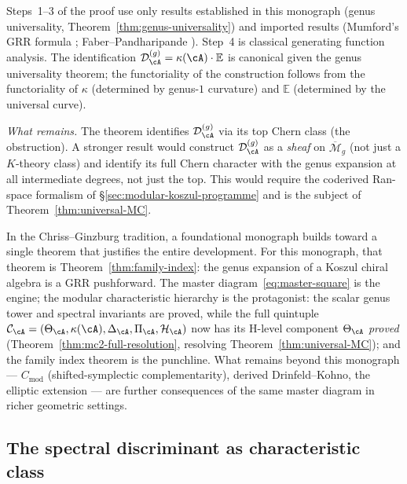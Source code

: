 \begin{remark}[Scope]\label{rem:family-index-scope}
Steps~1--3 of the proof use only results established
in this monograph (genus universality,
Theorem~\ref{thm:genus-universality}) and imported results
(Mumford's GRR formula \cite{Mumford83}; Faber--Pandharipande
\cite{FP00}).  Step~4 is classical generating function analysis.
The identification $\mathcal{D}_{\cA}^{(g)} =
\kappa(\cA) \cdot \mathbb{E}$ is canonical given the genus
universality theorem; the functoriality of the construction
follows from the functoriality of $\kappa$ (determined by
genus-$1$ curvature) and $\mathbb{E}$ (determined by the
universal curve).

\emph{What remains.}
The theorem identifies $\mathcal{D}_{\cA}^{(g)}$ via its top Chern
class (the obstruction).  A stronger result would construct
$\mathcal{D}_{\cA}^{(g)}$ as a \emph{sheaf} on
$\overline{\mathcal{M}}_g$ (not just a $K$-theory class) and
identify its full Chern character with the genus expansion at all
intermediate degrees, not just the top.  This would require the
coderived Ran-space formalism of
\S\ref{sec:modular-koszul-programme} and is the subject of
Theorem~\ref{thm:universal-MC}.
\end{remark}

\begin{remark}
\label{rem:grr-horizon}
In the Chriss--Ginzburg tradition, a foundational monograph
builds toward a single theorem that justifies the entire
development.  For this monograph, that theorem is
Theorem~\ref{thm:family-index}: the genus expansion of a
Koszul chiral algebra is a GRR pushforward.
The master diagram~\eqref{eq:master-square} is the engine;
the modular characteristic hierarchy is the protagonist:
the scalar genus tower and spectral invariants are proved,
while the full quintuple
$\mathcal{C}_{\cA} = (\Theta_{\cA}, \kappa(\cA), \Delta_{\cA},
\Pi_{\cA}, \mathcal{H}_{\cA})$ now has its H-level component
$\Theta_{\cA}$ \emph{proved}
\textup{(}Theorem~\textup{\ref{thm:mc2-full-resolution}},
resolving
Theorem~\textup{\ref{thm:universal-MC}}\textup{)};
and the family index theorem is the punchline.
What remains beyond this monograph ---
$C_{\mathrm{mod}}$ (shifted-symplectic complementarity),
derived Drinfeld--Kohno, the elliptic extension ---
are further consequences of the same master diagram in richer
geometric settings.
\end{remark}

\subsection{The spectral discriminant as characteristic class}

